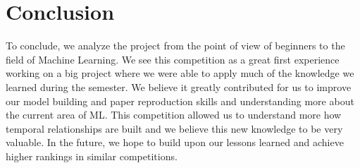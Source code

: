 \documentclass{article}
\begin{document}
\section{Conclusion}
To conclude, we analyze the project from the point of view of beginners to the field of Machine Learning. We see this competition as a great first experience working on a big project where we were able to apply much of the knowledge we learned during the semester. We believe it greatly contributed for us to improve our model building and paper reproduction skills and understanding more about the current area of ML. This competition allowed us to understand more how temporal relationships are built and we believe this new knowledge to be very valuable. In the future, we hope to build upon our lessons learned and achieve higher rankings in similar competitions.

\small
\printbibliography
\end{document}
